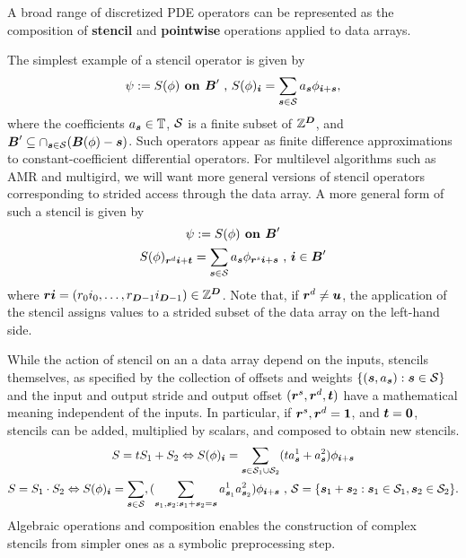 \documentclass[12pt]{article}
\begin{document}
A broad range of discretized PDE operators can be represented as the composition of
\textbf{stencil} and \textbf{pointwise} operations applied to data arrays. 

The simplest example of a stencil operator is given by 
\begin{gather*}
\psi := S(\phi)  \hbox{\bf{ on }} {\boldsymbol{B}}' \hbox{ , } S(\phi)_{\boldsymbol{i}} = 
\sum \limits_{{\boldsymbol{s}} \in {\mathcal{S}}} a_{\boldsymbol{s}} \phi_{{\boldsymbol{i}} + {\boldsymbol{s}}},
\end{gather*}
where the coefficients $a_{\boldsymbol{s}} \in \mathbb{T}$, ${\mathcal{S}}$ is a finite subset of $\mathbb{Z}^{\boldsymbol{D}}$, and ${\boldsymbol{B}}' \subseteq \cap_{{\boldsymbol{s}} \in {\mathcal{S}}} ({\boldsymbol{B}}(\phi)- {\boldsymbol{s}})$. Such operators appear as finite difference approximations to constant-coefficient differential operators. For multilevel algorithms such as AMR and multigird, we will want more general versions of stencil operators corresponding to strided access through the data array. A more general form of such a stencil is given by
\begin{gather*}
\psi := S(\phi)  \hbox{\bf{ on }} {\boldsymbol{B}}' \\
 S(\phi)_{{\boldsymbol{r}}^{d} {\boldsymbol{i}} + {\boldsymbol{t}}} = 
\sum \limits_{{\boldsymbol{s}} \in {\mathcal{S}}} a_{\boldsymbol{s}} \phi_{{\boldsymbol{r}}^{s}{\boldsymbol{i}} + {\boldsymbol{s}}} \hbox{ , }
{\boldsymbol{i}} \in {\boldsymbol{B}}'
\end{gather*}
where ${\boldsymbol{r}} {\boldsymbol{i}} = (r_0 i_0 , \dots , r_{{\boldsymbol{D}}-1} i_{{\boldsymbol{D}}-1}) \in \mathbb{Z}^{\boldsymbol{D}}$. Note that, if ${\boldsymbol{r}}^d \neq {\boldsymbol{u}}$, the application of the stencil assigns values to a strided subset of the data array on the left-hand side. 

While the action of stencil on an a data array depend on the inputs, stencils themselves, as specified by the collection of offsets and weights $\{({\boldsymbol{s}},a_{\boldsymbol{s}}): {\boldsymbol{s}} \in {\mathcal{S}}\}$ and the input and output stride and output offset $({\boldsymbol{r}}^s, {\boldsymbol{r}}^d, {\boldsymbol{t}})$ have a mathematical meaning independent of the inputs. In particular, if ${\boldsymbol{r}}^s, {\boldsymbol{r}}^d = {\boldsymbol{1}}$, and ${\boldsymbol{t}} = {\boldsymbol{0}}$, stencils can be added, multiplied by scalars, and composed to obtain new stencils. 
\begin{gather*} 
S = t S_1 + S_2 \Leftrightarrow
S(\phi)_{\boldsymbol{i}} = \sum \limits_{{\boldsymbol{s}} \in {\mathcal{S}}_1 \cup {\mathcal{S}}_2} 
(t a^1_{{\boldsymbol{s}}} + a^2_{{\boldsymbol{s}}}) \phi_{{\boldsymbol{i}} + {\boldsymbol{s}}} \\
S = S_1 \cdot S_2 \Leftrightarrow S (\phi)_{\boldsymbol{i}} = \sum \limits_{{\boldsymbol{s}}\in {\mathcal{S}} } ,
(\sum \limits_{{\boldsymbol{s}}_1,{\boldsymbol{s}}_2: {\boldsymbol{s}}_1 + {\boldsymbol{s}}_2 = {\boldsymbol{s}}} a^1_{{\boldsymbol{s}}_1}  a^2_{{\boldsymbol{s}}_2} ) \phi_{{\boldsymbol{i}} + {\boldsymbol{s}}} \hbox{ , } {\mathcal{S}} = \{{\boldsymbol{s}}_1 + {\boldsymbol{s}}_2: {\boldsymbol{s}}_1 \in {\mathcal{S}}_1 , {\boldsymbol{s}}_2 \in {\mathcal{S}}_2\}.
\end{gather*}
Algebraic operations and composition enables the construction of complex stencils from simpler ones as a symbolic preprocessing step.
\end{document}
